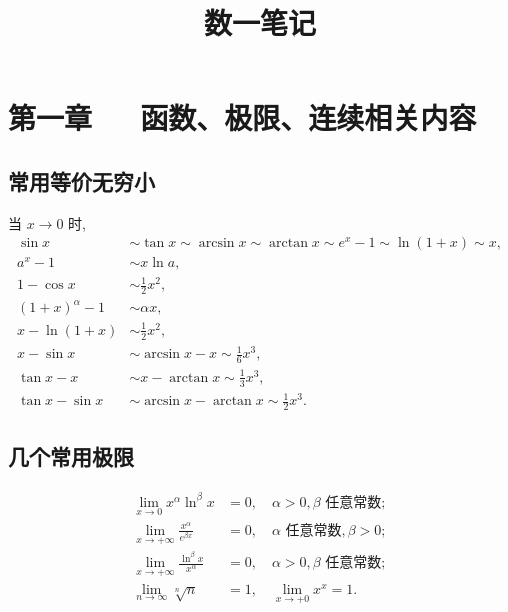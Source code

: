 \documentclass[UTF8]{ctexart}
\title{数一笔记}
\author{}
\date{}
\theoremstyle{remark}
\begin{document}
	\maketitle
	\tableofcontents
	\newpage
	\section{第一章~~~函数、极限、连续相关内容}
	\subsection{常用等价无穷小}
	当 \(x \to 0\) 时,
	\begin{align*}
		\sin x &\sim \tan x \sim \arcsin x \sim \arctan x \sim e^x - 1 \sim \ln(1 + x) \sim x,\\
		a^x - 1 &\sim x\ln a,\\
		1 - \cos x &\sim \frac{1}{2}x^2,\\
		(1 + x)^{\alpha} - 1 &\sim \alpha x,\\
		x - \ln(1 + x) &\sim \frac{1}{2}x^2,\\
		x - \sin x &\sim \arcsin x - x \sim \frac{1}{6}x^3,\\
		\tan x - x &\sim x - \arctan x \sim \frac{1}{3}x^3,\\
		\tan x - \sin x &\sim \arcsin x - \arctan x \sim \frac{1}{2}x^3.
	\end{align*}
	
	\subsection{几个常用极限}
	\begin{align*}
		\lim_{x \to 0} x^{\alpha} \ln^{\beta} x &= 0, \quad \alpha > 0, \beta \text{ 任意常数};\\
		\lim_{x \to +\infty} \frac{x^{\alpha}}{e^{\beta x}} &= 0, \quad \alpha \text{ 任意常数}, \beta > 0;\\
		\lim_{x \to +\infty} \frac{\ln^{\beta} x}{x^{\alpha}} &= 0, \quad \alpha > 0, \beta \text{ 任意常数};\\
		\lim_{n \to \infty} \sqrt[n]{n} &= 1, \quad \lim_{x \to +0} x^x = 1.
	\end{align*}
	
\end{document}
